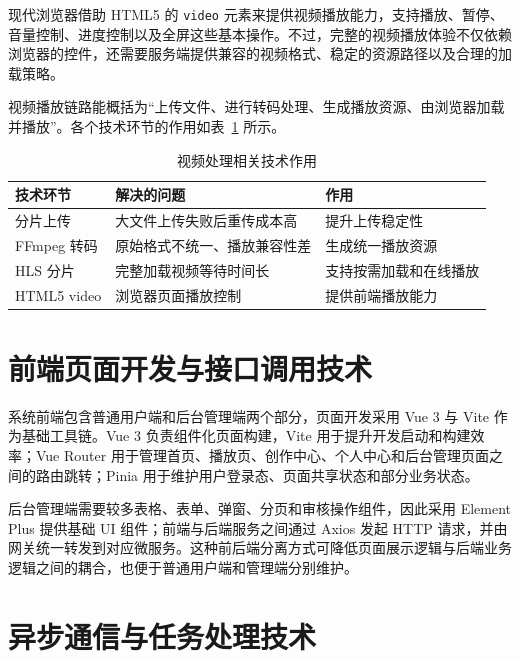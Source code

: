 现代浏览器借助 HTML5 的 \texttt{video} 元素来提供视频播放能力，支持播放、暂停、音量控制、进度控制以及全屏这些基本操作\cite{whatwgvideo}。不过，完整的视频播放体验不仅依赖浏览器的控件，还需要服务端提供兼容的视频格式、稳定的资源路径以及合理的加载策略。

视频播放链路能概括为“上传文件、进行转码处理、生成播放资源、由浏览器加载并播放”。各个技术环节的作用如表~\ref{tab:video-tech-summary-revised} 所示。

\begin{table}[htbp]
  \centering
  \caption{视频处理相关技术作用}
  \label{tab:video-tech-summary-revised}
  \begin{tabular}{p{}p{}p{}}
    \hline
    \textbf{技术环节} & \textbf{解决的问题} & \textbf{作用} \\
    \hline
    分片上传 & 大文件上传失败后重传成本高 & 提升上传稳定性 \\
    FFmpeg 转码 & 原始格式不统一、播放兼容性差 & 生成统一播放资源 \\
    HLS 分片 & 完整加载视频等待时间长 & 支持按需加载和在线播放 \\
    HTML5 video & 浏览器页面播放控制 & 提供前端播放能力 \\
    \hline
  \end{tabular}
\end{table}

\section{前端页面开发与接口调用技术}
\label{sec:frontend-tech}

系统前端包含普通用户端和后台管理端两个部分，页面开发采用 Vue 3 与 Vite 作为基础工具链。Vue 3 负责组件化页面构建，Vite 用于提升开发启动和构建效率；Vue Router 用于管理首页、播放页、创作中心、个人中心和后台管理页面之间的路由跳转；Pinia 用于维护用户登录态、页面共享状态和部分业务状态\cite{vueguide,viteguide,vuerouterdocs,piniadocs}。

后台管理端需要较多表格、表单、弹窗、分页和审核操作组件，因此采用 Element Plus 提供基础 UI 组件；前端与后端服务之间通过 Axios 发起 HTTP 请求，并由网关统一转发到对应微服务\cite{elementplusdocs,axiosdocs}。这种前后端分离方式可降低页面展示逻辑与后端业务逻辑之间的耦合，也便于普通用户端和管理端分别维护。

\section{异步通信与任务处理技术}
\label{sec:async-message-task}

